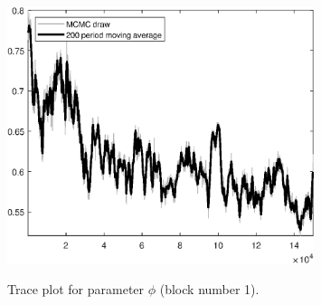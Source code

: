 \begin{figure}[H]
\centering
  \includegraphics[width=0.8\textwidth]{BRS_sectoral_KK/graphs/TracePlot_phi_blck_1}\\
    \caption{Trace plot for parameter ${\phi}$ (block number 1).}
\end{figure}

